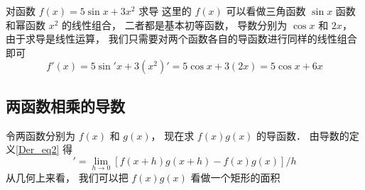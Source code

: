 \begin{exam}{对函数 $f(x) = 5\sin x + 3x^2$ 求导}
这里的 $f(x)$ 可以看做三角函数 $\sin x$ 函数和幂函数 $x^2$ 的线性组合， 二者都是基本初等函数， 导数分别为 $\cos x$ 和 $2x$， 由于求导是线性运算， 我们只需要对两个函数各自的导函数进行同样的线性组合即可
\begin{equation}
f'(x) = 5 \sin' x + 3(x^2)' = 5 \cos x + 3(2x) = 5\cos x + 6x
\end{equation}
\end{exam}

\subsection{两函数相乘的导数}
令两函数分别为 $f(x)$ 和 $g(x)$， 现在求 $f(x)g(x)$ 的导函数． 由导数的定义\autoref{Der_eq2} 得
\begin{equation}
[f(x)g(x)]' = \lim_{h\to 0}[f(x+h)g(x+h) - f(x)g(x)]/h
\end{equation}
从几何上来看， 我们可以把 $f(x)g(x)$ 看做一个矩形的面积


















